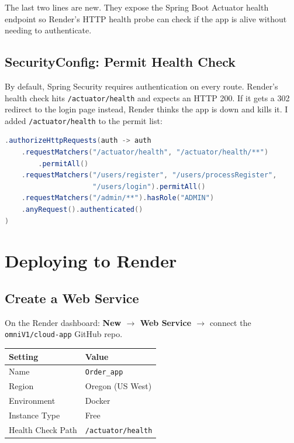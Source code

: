 \documentclass[11pt,letterpaper]{article}
\begin{document}
The last two lines are new. They expose the Spring Boot Actuator health endpoint so Render's HTTP health probe can check if the app is alive without needing to authenticate.

\subsection{SecurityConfig: Permit Health Check}

By default, Spring Security requires authentication on every route. Render's health check hits \texttt{/actuator/health} and expects an HTTP 200. If it gets a 302 redirect to the login page instead, Render thinks the app is down and kills it. I added \texttt{/actuator/health} to the permit list:

\begin{lstlisting}[language=Java,caption={SecurityConfig.java: health-check permit}]
.authorizeHttpRequests(auth -> auth
    .requestMatchers("/actuator/health", "/actuator/health/**")
        .permitAll()
    .requestMatchers("/users/register", "/users/processRegister",
                     "/users/login").permitAll()
    .requestMatchers("/admin/**").hasRole("ADMIN")
    .anyRequest().authenticated()
)
\end{lstlisting}

\section{Deploying to Render}

\subsection{Create a Web Service}

On the Render dashboard: \textbf{New $\rightarrow$ Web Service $\rightarrow$} connect the \texttt{omniV1/cloud-app} GitHub repo.

\begin{center}
\begin{tabular}{ll}
\toprule
\textbf{Setting} & \textbf{Value} \\
\midrule
Name             & \texttt{Order\_app} \\
Region           & Oregon (US West) \\
Environment      & Docker \\
Instance Type    & Free \\
Health Check Path & \texttt{/actuator/health} \\
\bottomrule
\end{tabular}
\end{center}
\end{document}
